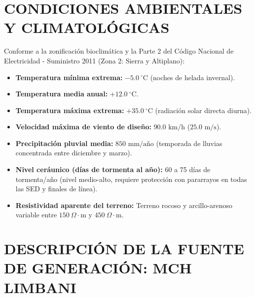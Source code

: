 \section{CONDICIONES AMBIENTALES Y CLIMATOLÓGICAS}

Conforme a la zonificación bioclimática y la Parte 2 del Código Nacional de Electricidad - Suministro 2011 (Zona 2: Sierra y Altiplano):
\begin{itemize}
  \item \textbf{Temperatura mínima extrema:} $-5.0\ ^\circ\text{C}$ (noches de helada invernal).
  \item \textbf{Temperatura media anual:} $+12.0\ ^\circ\text{C}$.
  \item \textbf{Temperatura máxima extrema:} $+35.0\ ^\circ\text{C}$ (radiación solar directa diurna).
  \item \textbf{Velocidad máxima de viento de diseño:} $90.0\text{ km/h}$ ($25.0\text{ m/s}$).
  \item \textbf{Precipitación pluvial media:} $850\text{ mm/año}$ (temporada de lluvias concentrada entre diciembre y marzo).
  \item \textbf{Nivel ceráunico (días de tormenta al año):} 60 a 75 días de tormenta/año (nivel medio-alto, requiere protección con pararrayos en todas las SED y finales de línea).
  \item \textbf{Resistividad aparente del terreno:} Terreno rocoso y arcillo-arenoso variable entre $150\ \Omega\cdot\text{m}$ y $450\ \Omega\cdot\text{m}$.
\end{itemize}

\section{DESCRIPCIÓN DE LA FUENTE DE GENERACIÓN: MCH LIMBANI}

